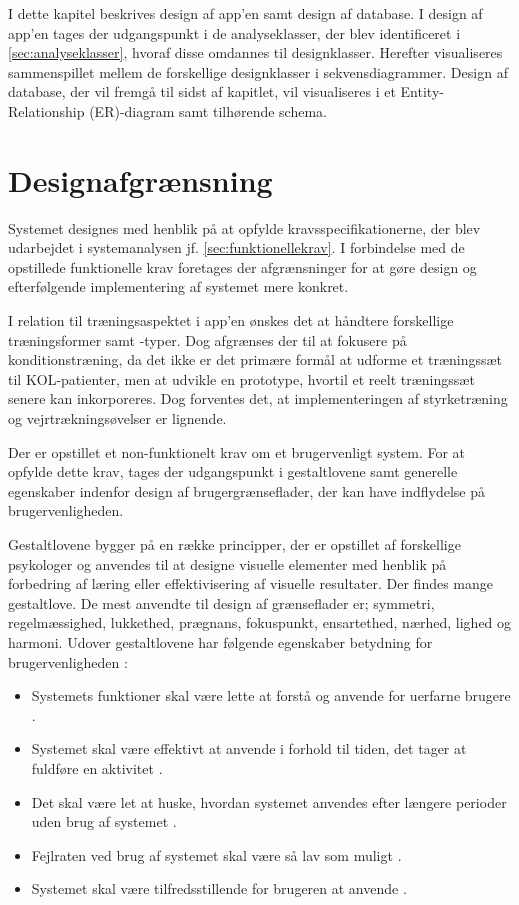I dette kapitel beskrives design af app'en samt design af database. I design af app'en tages der udgangspunkt i de analyseklasser, der blev identificeret i \autoref{sec:analyseklasser}, hvoraf disse omdannes til designklasser. Herefter visualiseres sammenspillet mellem de forskellige designklasser i sekvensdiagrammer. Design af database, der vil fremgå til sidst af kapitlet, vil visualiseres i et Entity-Relationship (ER)-diagram samt tilhørende schema. 

\section{Designafgrænsning} \label{sec:brugervenlighed}
Systemet designes med henblik på at opfylde kravsspecifikationerne, der blev udarbejdet i systemanalysen jf. \autoref{sec:funktionellekrav}. I forbindelse med de opstillede funktionelle krav foretages der afgrænsninger for at gøre design og efterfølgende implementering af systemet mere konkret. 

I relation til træningsaspektet i app'en ønskes det at håndtere forskellige træningsformer samt -typer. Dog afgrænses der til at fokusere på konditionstræning, da det ikke er det primære formål at udforme et træningssæt til KOL-patienter, men at udvikle en prototype, hvortil et reelt træningssæt senere kan inkorporeres. Dog forventes det, at implementeringen af styrketræning og vejrtrækningsøvelser er lignende. 

Der er opstillet et non-funktionelt krav om et brugervenligt system. For at opfylde dette krav, tages der udgangspunkt i gestaltlovene samt generelle egenskaber indenfor design af brugergrænseflader, der kan have indflydelse på brugervenligheden. 

Gestaltlovene bygger på en række principper, der er opstillet af forskellige psykologer og anvendes til at designe visuelle elementer med henblik på forbedring af læring eller effektivisering af visuelle resultater. Der findes mange gestaltlove. De mest anvendte til design af grænseflader er; symmetri, regelmæssighed, lukkethed, prægnans, fokuspunkt, ensartethed, nærhed, lighed og harmoni.\cite{Chang2002} Udover gestaltlovene har følgende egenskaber betydning for brugervenligheden \cite{ferre2001}:
\begin{itemize}
\item Systemets funktioner skal være lette at forstå og anvende for uerfarne brugere \cite{ferre2001}.
\item Systemet skal være effektivt at anvende i forhold til tiden, det tager at fuldføre en aktivitet \cite{ferre2001}.
\item Det skal være let at huske, hvordan systemet anvendes efter længere perioder uden brug af systemet \cite{ferre2001}.
\item Fejlraten ved brug af systemet skal være så lav som muligt \cite{ferre2001}.
\item Systemet skal være tilfredsstillende for brugeren at anvende \cite{ferre2001}.
\end{itemize}
 

 





